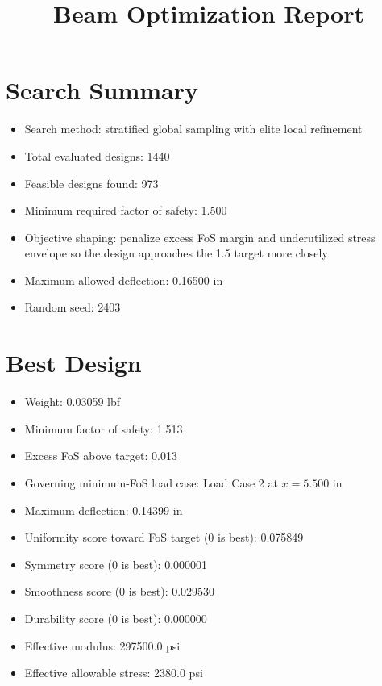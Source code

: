 \documentclass[11pt]{article}
\title{Beam Optimization Report}
\date{}
\begin{document}
\maketitle

\section*{Search Summary}
\begin{itemize}
\item Search method: stratified global sampling with elite local refinement
\item Total evaluated designs: 1440
\item Feasible designs found: 973
\item Minimum required factor of safety: 1.500
\item Objective shaping: penalize excess FoS margin and underutilized stress envelope so the design approaches the 1.5 target more closely
\item Maximum allowed deflection: 0.16500 in
\item Random seed: 2403
\end{itemize}

\section*{Best Design}
\begin{itemize}
\item Weight: 0.03059 lbf
\item Minimum factor of safety: 1.513
\item Excess FoS above target: 0.013
\item Governing minimum-FoS load case: Load Case 2 at $x=5.500$ in
\item Maximum deflection: 0.14399 in
\item Uniformity score toward FoS target (0 is best): 0.075849
\item Symmetry score (0 is best): 0.000001
\item Smoothness score (0 is best): 0.029530
\item Durability score (0 is best): 0.000000
\item Effective modulus: 297500.0 psi
\item Effective allowable stress: 2380.0 psi
\end{itemize}
\end{document}
